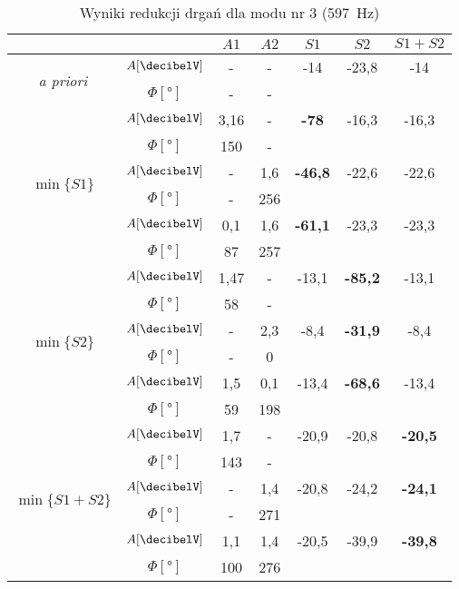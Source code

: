 \documentclass[polish,a4paper,11pt]{mwart}
\begin{document}
  \begin{table}[!tbh]
    \centering
    \caption{Wyniki redukcji drgań dla modu nr 3 (\SI{597}{\hertz})}
    \label{tab:red3}
    \begin{tabular}{|c|c|c|c|c|c|c|}
      \cline{3-7}
      \multicolumn{2}{c|}{}&$A1$&$A2$&$S1$&$S2$&$S1+S2$\\\hline
      \multirow{2}{*}{\textit{a priori}} & $A [\si{\decibelV}]$ & - & - & -14 & -23,8 & -14\\\cline{2-7}
					 & $\Phi [\si{\degree}]$ & - & - & \multicolumn{3}{c}{}\\\hline
      \multirow{6}{*}{$\min\{S1\}$}   &   $A [\si{\decibelV}]$ & 3,16 & - & \textbf{-78} & -16,3 & -16,3\\\cline{2-7}
				      &$\Phi [\si{\degree}]$ & 150 & - & \multicolumn{3}{c}{}\\\cline{2-7}
				      &   $A [\si{\decibelV}]$ & - & 1,6 & \textbf{-46,8} & -22,6 & -22,6\\\cline{2-7}
				      &$\Phi [\si{\degree}]$ & - & 256 & \multicolumn{3}{c}{}\\\cline{2-7}
				      &   $A [\si{\decibelV}]$ & 0,1 & 1,6 & \textbf{-61,1} & -23,3 & -23,3\\\cline{2-7}
				      &$\Phi [\si{\degree}]$ & 87 & 257 & \multicolumn{3}{c}{}\\\hline
      \multirow{6}{*}{$\min\{S2\}$}   &   $A [\si{\decibelV}]$ & 1,47 & - & -13,1 & \textbf{-85,2} & -13,1\\\cline{2-7}
				      &$\Phi [\si{\degree}]$ & 58 & - & \multicolumn{3}{c}{}\\\cline{2-7}
				      &   $A [\si{\decibelV}]$ & - & 2,3 & -8,4 & \textbf{-31,9} & -8,4\\\cline{2-7}
				      &$\Phi [\si{\degree}]$ & - & 0 & \multicolumn{3}{c}{}\\\cline{2-7}
				      &   $A [\si{\decibelV}]$ & 1,5 & 0,1 & -13,4 & \textbf{-68,6} & -13,4\\\cline{2-7}
				      &$\Phi [\si{\degree}]$ & 59 & 198 & \multicolumn{3}{c}{}\\\hline
      \multirow{6}{*}{$\min\{S1+S2\}$}&   $A [\si{\decibelV}]$ & 1,7 & - & -20,9 & -20,8 & \textbf{-20,5} \\\cline{2-7}
				      &$\Phi [\si{\degree}]$ & 143 & - & \multicolumn{3}{c}{}\\\cline{2-7}
				      &   $A [\si{\decibelV}]$ & - & 1,4 & -20,8 & -24,2 & \textbf{-24,1} \\\cline{2-7}
				      &$\Phi [\si{\degree}]$ & - & 271 & \multicolumn{3}{c}{}\\\cline{2-7}
				      &   $A [\si{\decibelV}]$ & 1,1 & 1,4 & -20,5 & -39,9 & \textbf{-39,8} \\\cline{2-7}
				      &$\Phi [\si{\degree}]$ & 100 & 276 & \multicolumn{3}{c}{}\\\cline{1-4}
    \end{tabular}
  \end{table}
\end{document}
